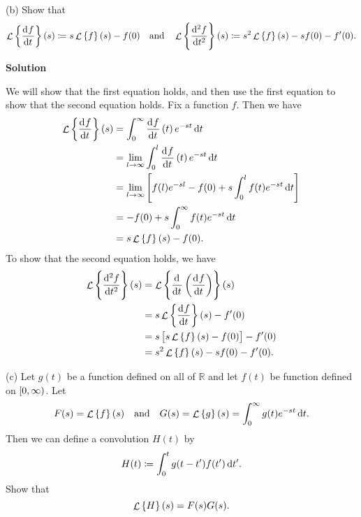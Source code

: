 \documentclass{article}
\DeclareMathOperator{\Lagr}{\mathcal{L}}
\begin{document}
\vspace{5mm}

(b) Show that
%
\begin{equation*}
    \Lagr \cbr{\dod{f}{t}}(s) \coloneqq s \Lagr \cbr{f}(s) - f(0)
    \quad \text{and} \quad
    \Lagr \cbr{\dod[2]{f}{t}}(s) \coloneqq s^2 \Lagr \cbr{f}(s) - s f(0) - f^\prime(0)
    .
\end{equation*}

\textbf{Solution}

We will show that the first equation holds, and then use the first
equation to show that the second equation holds. Fix a function $f$.
Then we have
%
\begin{align*}
    \Lagr \cbr{\dod{f}{t}}(s)
        &= \int_0^\infty \dod{f}{t}(t) \, e^{-s t} \dif t \\
        &= \lim_{l \to \infty} \int_0^l \dod{f}{t}(t) \, e^{-s t} \dif t \\
        &= \lim_{l \to \infty}
            \sbr{
                f(l) e^{- s l} - f(0) + s \int_0^l f(t) e^{-s t} \dif t
            } \\
        &=  - f(0) + s \int_0^\infty f(t) e^{-s t} \dif t \\
        &= s \Lagr \cbr{f}(s) - f(0)
        .
\end{align*}
%
To show that the second equation holds, we have
%
\begin{align*}
    \Lagr \cbr{\dod[2]{f}{t}}(s)
        &= \Lagr \cbr{\dod{}{t} \del{\dod{f}{t}}}(s) \\
        &= s \Lagr \cbr{\dod{f}{t}}(s) - f^\prime(0) \\
        &= s \sbr{s \Lagr \cbr{f}(s) - f(0)} - f^\prime(0) \\
        &= s^2 \Lagr \cbr{f}(s) - s f(0) - f^\prime(0)
        .
\end{align*}

\vspace{5mm}

(c) Let $g(t)$ be a function defined on all of $\mathbb{R}$ and let
$f(t)$ be function defined on $\intco{0, \infty}$. Let
%
\begin{equation*}
    F(s) = \Lagr \cbr{f}(s)
    \quad \text{and} \quad
    G(s) = \Lagr \cbr{g}(s) = \int_0^\infty g(t) e^{-s t} \dif t
    .
\end{equation*}
%
Then we can define a convolution $H(t)$ by
%
\begin{equation*}
    H(t) \coloneqq \int_0^t g(t - t^\prime) f(t^\prime) \dif t^\prime
    .
\end{equation*}
%
Show that
%
\begin{equation*}
    \Lagr \cbr{H}(s) = F(s) G(s)
    .
\end{equation*}
\end{document}
